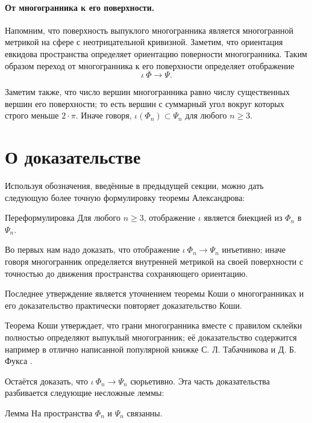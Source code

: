 \documentclass[oneside,a4paper]{article}
\begin{document}
\paragraph{От многогранника к его поверхности.}
Напомним, что поверхность выпуклого многогранника является многогранной метрикой на сфере с неотрицательной кривизной.
Заметим, что ориентация евкидова пространства определяет ориентацию поверности многогранника.
Таким образом переход от многогранника к его поверхности определяет отображение 
\[\iota\:\Phi\to \Psi.\]

Заметим также, что число вершин многогранника равно числу существенных вершин его поверхности;
то есть вершин с суммарный угол вокруг которых строго меньше $2\cdot\pi$.
Иначе говоря, $\iota(\Phi_n)\subset \Psi_n$ для любого $n\ge 3$.

\section{О доказательстве}

Используя обозначения, введённые в предыдущей секции, можно дать следующую более точную формулировку теоремы Александрова:

\begin{thm}{Переформулировка}
Для любого $n\ge 3$,
отображение $\iota$ является биекцией из $\Phi_n$ в $\Psi_n$.
\end{thm}


Во первых нам надо доказать, что отображение $\iota\:\Phi_n\to\Psi_n$ инъетивно; иначе говоря многогранник определяется внутренней метрикой на своей поверхности с точностью до движения пространства сохраняющего ориентацию.

Последнее утверждение является уточнением теоремы Коши о многогранниках и его доказательство практически повторяет доказательство Коши.

Теорема Коши утверждает, что грани многогранника вместе с правилом склейки полностью определяют выпуклый многогранник;
её доказательство содержится например в отлично написанной популярной книжке С. Л. Табачникова и Д. Б. Фукса \cite{tabacnikov-fuks}.

Остаётся доказать, что $\iota\:\Phi_n\to\Psi_n$ сюрьетивно.
Эта часть доказательства разбивается следующие несложные леммы:

\begin{thm}{Лемма}
На пространства $\Phi_n$ и $\Psi_n$ связанны.
\end{thm}
\end{document}
